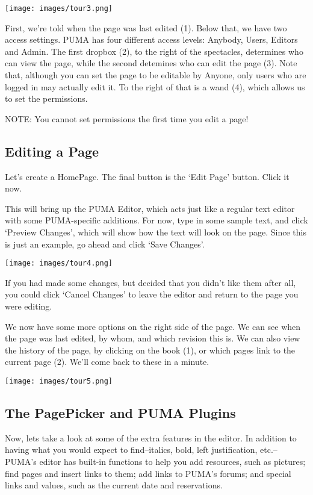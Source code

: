 \documentclass[12pt]{article}
\begin{document}
 \texttt{[image: images/tour3.png]} 

First, we're told when the page was last edited (1). Below that, we have two access settings. PUMA has four different access levels: Anybody, Users, Editors and Admin. The first dropbox (2), to the right of the spectacles, determines who can view the page, while the second detemines who can edit the page (3). Note that, although you can set the page to be editable by Anyone, only users who are logged in may actually edit it. To the right of that is a wand (4), which allows us to set the permissions.

NOTE: You cannot set permissions the first time you edit a page!

\subsection*{Editing a Page}

Let's create a HomePage. The final button is the `Edit Page' button. Click it now.

This will bring up the PUMA Editor, which acts just like a regular text editor with some PUMA-specific additions. For now, type in some sample text, and click `Preview Changes', which will show how the text will look on the page. Since this is just an example, go ahead and click `Save Changes'.

\texttt{[image: images/tour4.png]} 

If you had made some changes, but decided that you didn't like them after all, you could click `Cancel Changes' to leave the editor and return to the page you were editing.

We now have some more options on the right side of the page. We can see when the page was last edited, by whom, and which revision this is. We can also view the history of the page, by clicking on the book (1), or which pages link to the current page (2). We'll come back to these in a minute.

\texttt{[image: images/tour5.png]} 

\subsection*{The PagePicker and PUMA Plugins}

Now, lets take a look at some of the extra features in the editor.  In addition to having what you would expect to find--italics, bold, left justification, etc.--PUMA's editor has built-in functions to help you add resources, such as pictures; find pages and insert links to them; add links to PUMA's forums; and special links and values, such as the current date and reservations.
\end{document}
